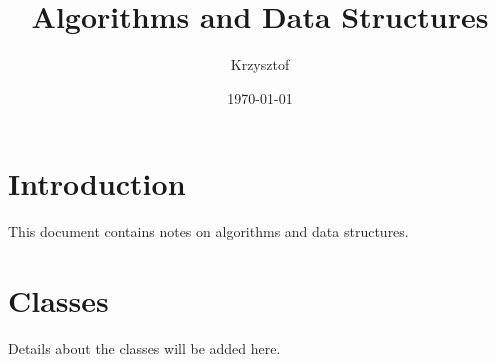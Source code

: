 \documentclass{article}
\title{Algorithms and Data Structures}
\author{Krzysztof}
\date{\today}
\begin{document}
\maketitle

\section{Introduction}

This document contains notes on algorithms and data structures.

\section{Classes}

Details about the classes will be added here.
\end{document}
